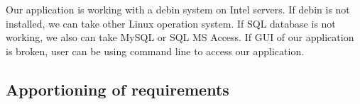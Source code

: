 Our application is working with a debin system on Intel servers.
If debin is not installed, we can take other Linux operation system.
If SQL database is not working, we also can take MySQL or SQL MS Access.
If GUI of our application is broken, user can be using command line to access our application.

\subsection{Apportioning of requirements}
